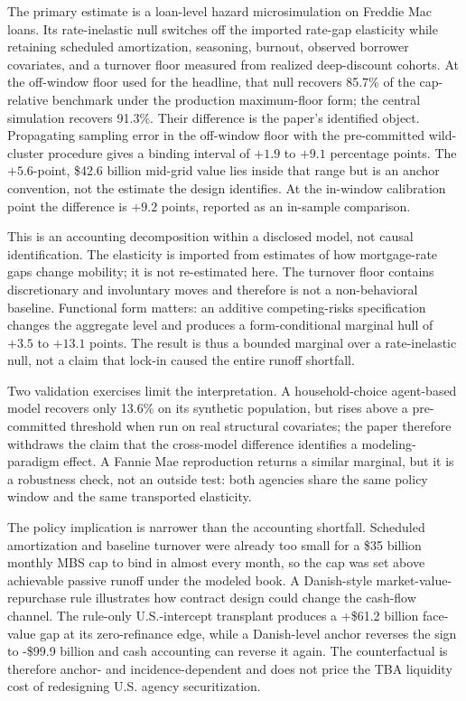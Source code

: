 \documentclass[12pt]{article}
\begin{document}
The primary estimate is a loan-level hazard microsimulation on Freddie Mac
loans. Its rate-inelastic null switches off the imported rate-gap elasticity
while retaining scheduled amortization, seasoning, burnout, observed borrower
covariates, and a turnover floor measured from realized deep-discount cohorts.
At the off-window floor used for the headline, that null recovers 85.7\% of the
cap-relative benchmark under the production maximum-floor form; the central
simulation recovers 91.3\%. Their difference is the paper's identified object.
Propagating sampling error in the off-window floor with the pre-committed
wild-cluster procedure gives a binding interval of $+1.9$ to $+9.1$ percentage
points. The $+5.6$-point, \$42.6 billion mid-grid value lies inside that range
but is an anchor convention, not the estimate the design identifies. At the
in-window calibration point the difference is $+9.2$ points, reported as an
in-sample comparison.

This is an accounting decomposition within a disclosed model, not causal
identification. The elasticity is imported from estimates of how mortgage-rate
gaps change mobility; it is not re-estimated here. The turnover floor contains
discretionary and involuntary moves and therefore is not a non-behavioral
baseline. Functional form matters: an additive competing-risks specification
changes the aggregate level and produces a form-conditional marginal hull of
$+3.5$ to $+13.1$ points. The result is thus a bounded marginal over a
rate-inelastic null, not a claim that lock-in caused the entire runoff
shortfall.

Two validation exercises limit the interpretation. A household-choice
agent-based model recovers only 13.6\% on its synthetic population, but rises
above a pre-committed threshold when run on real structural covariates; the
paper therefore withdraws the claim that the cross-model
difference identifies a modeling-paradigm effect. A Fannie Mae reproduction
returns a similar marginal, but it is a robustness check, not an outside test:
both agencies share the same policy window and the same transported elasticity.

The policy implication is narrower than the accounting shortfall. Scheduled
amortization and baseline turnover were already too small for a \$35 billion
monthly MBS cap to bind in almost every month, so the cap was set above
achievable passive runoff under the modeled book. A Danish-style
market-value-repurchase rule illustrates how contract design could change the
cash-flow channel. The rule-only U.S.-intercept transplant produces a
+\$61.2 billion face-value gap at its zero-refinance edge, while a
Danish-level anchor reverses the sign to -\$99.9 billion and cash accounting
can reverse it again. The counterfactual is therefore anchor- and
incidence-dependent and does not price the TBA liquidity cost of redesigning
U.S. agency securitization.
\end{document}
